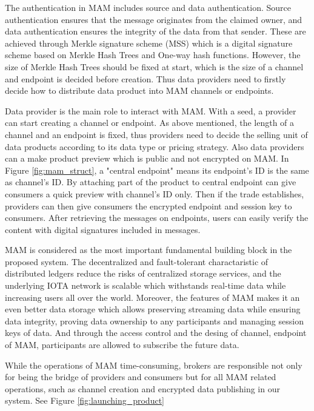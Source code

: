 \documentclass[journal,article,applsci,submit,moreauthors,pdftex]{Definitions/mdpi}
\begin{document}
\begin{itemize}[leftmargin=*,labelsep=5.8mm]
The authentication in MAM includes source and data authentication. Source authentication ensures that the message originates from the claimed owner, and data authentication ensures the integrity of the data from that sender. These are achieved through Merkle signature scheme\cite{MSS} (MSS) which is a digital signature scheme based on Merkle Hash Trees and One-way hash functions. However, the size of Merkle Hash Trees should be fixed at start, which is the size of a channel and endpoint is decided before creation. Thus data providers need to firstly decide how to distribute data product into MAM channels or endpoints.

Data provider is the main role to interact with MAM. With a seed, a provider can start creating a channel or endpoint. As above mentioned, the length of a channel and an endpoint is fixed, thus providers need to decide the selling unit of data products according to its data type or pricing strategy. Also data providers can a make product preview which is public and not encrypted on MAM. In Figure \ref{fig:mam_struct}, a "central endpoint" means its endpoint's ID is the same as channel's ID. By attaching part of the product to central endpoint can give consumers a quick preview with channel's ID only. Then if the trade establishes, providers can then give consumers the encrypted endpoint and session key to consumers. After retrieving the messages on endpoints, users can easily verify the content with digital signatures included in messages. 

MAM is considered as the most important fundamental building block in the proposed system. The decentralized and fault-tolerant charactaristic of distributed ledgers reduce the risks of centralized storage services, and the underlying IOTA network is scalable which withstands real-time data while increasing users all over the world. Moreover, the features of MAM makes it an even better data storage which allows preserving streaming data while ensuring data integrity, proving data ownership to any participants and managing session keys of data. And through the access control and the desing of channel, endpoint of MAM, participants are allowed to subscribe the future data.  

While the operations of MAM time-consuming, brokers are responsible not only for being the bridge of providers and consumers but for all MAM related operations, such as channel creation and encrypted data publishing in our system. See Figure \ref{fig:launching_product}


\end{itemize}
\end{document}
